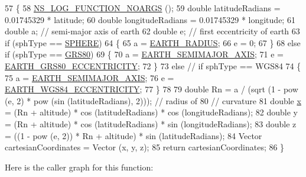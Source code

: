 \begin{DoxyCode}
57 \{
58   \hyperlink{log-macros-disabled_8h_a8f7e4afc291c9d29a65c18ac1f79197b}{NS\_LOG\_FUNCTION\_NOARGS} ();
59   \textcolor{keywordtype}{double} latitudeRadians = 0.01745329 * latitude;
60   \textcolor{keywordtype}{double} longitudeRadians = 0.01745329 * longitude;
61   \textcolor{keywordtype}{double} a; \textcolor{comment}{// semi-major axis of earth}
62   \textcolor{keywordtype}{double} e; \textcolor{comment}{// first eccentricity of earth}
63   \textcolor{keywordflow}{if} (sphType == \hyperlink{classns3_1_1GeographicPositions_a434138b76563c284972bc08a9c4a6882a96850ee7fd8e61d1b68344cc4a4949f6}{SPHERE})
64     \{
65       a = \hyperlink{namespacens3_acd9e5214ec8a357ee2eb37cde6bd58f3}{EARTH\_RADIUS};
66       e = 0;
67     \}
68   \textcolor{keywordflow}{else} \textcolor{keywordflow}{if} (sphType == \hyperlink{classns3_1_1GeographicPositions_a434138b76563c284972bc08a9c4a6882a474a5b39a855a2472921a1677beabea2}{GRS80})
69     \{
70       a = \hyperlink{namespacens3_a011e42941465510cfb1d15eb457d473d}{EARTH\_SEMIMAJOR\_AXIS};
71       e = \hyperlink{namespacens3_a8c73d82a37bf2ba6a451a684e23693aa}{EARTH\_GRS80\_ECCENTRICITY};
72     \}
73   \textcolor{keywordflow}{else} \textcolor{comment}{// if sphType == WGS84}
74     \{
75       a = \hyperlink{namespacens3_a011e42941465510cfb1d15eb457d473d}{EARTH\_SEMIMAJOR\_AXIS};
76       e = \hyperlink{namespacens3_a23aaf894114870574d65dafe5d9012de}{EARTH\_WGS84\_ECCENTRICITY};
77     \}
78 
79   \textcolor{keywordtype}{double} Rn = a / (sqrt (1 - pow (e, 2) * pow (sin (latitudeRadians), 2))); \textcolor{comment}{// radius of}
80                                                                            \textcolor{comment}{// curvature}
81   \textcolor{keywordtype}{double} \hyperlink{lte__link__budget__x2__handover__measures_8m_a9336ebf25087d91c818ee6e9ec29f8c1}{x} = (Rn + altitude) * cos (latitudeRadians) * cos (longitudeRadians);
82   \textcolor{keywordtype}{double} y = (Rn + altitude) * cos (latitudeRadians) * sin (longitudeRadians);
83   \textcolor{keywordtype}{double} z = ((1 - pow (e, 2)) * Rn + altitude) * sin (latitudeRadians);
84   Vector cartesianCoordinates = Vector (x, y, z);
85   \textcolor{keywordflow}{return} cartesianCoordinates;
86 \}
\end{DoxyCode}


Here is the caller graph for this function\+:


